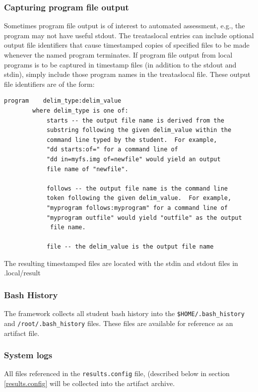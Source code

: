 \documentclass[12pt]{article}
\begin{document}
\subsubsection{Capturing program file output}
\label{program output}
Sometimes program file output is of interest to automated assessment, e.g., the program
may not have useful stdout.
The treataslocal entries can include optional output file identifiers that
cause timestamped copies of specified files to be made whenever the named program terminates.
If program file output from local programs is to be captured in timestamp files (in addition
to the stdout and stdin), simply include those program names in the treataslocal file.
These output file identifiers are of the form:
\begin{verbatim}
program    delim_type:delim_value
        where delim_type is one of:
            starts -- the output file name is derived from the 
            substring following the given delim_value within the 
            command line typed by the student.  For example, 
            "dd starts:of=" for a command line of 
            "dd in=myfs.img of=newfile" would yield an output 
            file name of "newfile".
     
            follows -- the output file name is the command line 
            token following the given delim_value.  For example, 
            "myprogram follows:myprogram" for a command line of
            "myprogram outfile" would yield "outfile" as the output 
             file name.

            file -- the delim_value is the output file name
\end{verbatim}
\noindent The resulting timestamped files are located with the stdin and stdout files in .local/result

\subsubsection{Bash History}
The framework collects all student bash history into the \texttt{\$HOME/.bash\_history} and \newline
\texttt{/root/.bash\_history} files.  These files are
available for reference as an artifact file.  

\subsubsection{System logs}
All files referenced in the {\tt results.config} file, (described below in section \ref{results.config}
will be collected into the artifact archive.  
\end{document}
